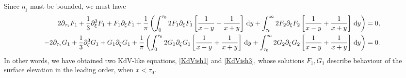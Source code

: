\documentclass[10pt,reqno,oneside,a4paper, landscape]{article}
\begin{document}
Since $\eta_1$ must be bounded, we must have 
\begin{align}
2 \partial_{\tau_1}F_1 + \frac{1}{3} \partial_\xi^3 F_1 + F_1\partial_\xi F_1 + \frac{1}{\pi} \left( \int_0^{\tau_0} 2 F_1  \partial_\xi F_1 \left[ \frac{1}{x-y} + \frac{1}{x+y} \right] \,\mathrm{d} y +\int_{\tau_0}^\infty 2 F_2 \partial_\xi F_2\left[ \frac{1}{x-y} + \frac{1}{x+y} \right] \,\mathrm{d} y \right) &= 0 \label{KdVish1}, \\
- 2 \partial_{\tau_1} G_1 +  \frac{1}{3} \partial_\zeta^3 G_1+ G_1 \partial_{\zeta} G_1  + \frac{1}{\pi} \left( \int_0^{\tau_0}  2 G_1 \partial_\zeta G_1 \left[ \frac{1}{x-y} + \frac{1}{x+y} \right] \,\mathrm{d} y +\int_{\tau_0}^\infty 2 G_2 \partial_\zeta G_2 \left[ \frac{1}{x-y} + \frac{1}{x+y} \right] \,\mathrm{d} y \right) &= 0. \label{KdVish3}
\end{align}
In other words, we have obtained two KdV-like equations, \eqref{KdVish1} and \eqref{KdVish3}, whose solutions $F_1, G_1$ describe behaviour of the surface elevation in the leading order, when $x<\tau_0.$
 
\end{document}
